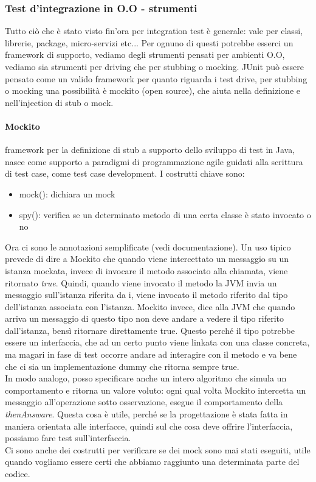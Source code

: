 \documentclass{article}
\begin{document}
\subsubsection{Test d'integrazione in O.O - strumenti}
Tutto ciò che è stato visto fin'ora per integration test è generale: vale per classi, librerie, package, micro-servizi etc... Per ognuno di questi potrebbe esserci un framework di supporto, vediamo degli strumenti pensati per ambienti O.O, vediamo sia strumenti per driving che per stubbing o mocking. JUnit può essere pensato come un valido framework per quanto riguarda i test drive, per stubbing o mocking una possibilità è mockito (open source), che aiuta nella definizione e nell'injection di stub o mock.
\paragraph{Mockito}framework per la definizione di stub a supporto dello sviluppo di test in Java, nasce come supporto a paradigmi di programmazione agile guidati alla scrittura di test case, come test case development. I costrutti chiave sono:
\begin{itemize}
\item mock(): dichiara un mock
\item spy(): verifica se un determinato metodo di una certa classe è stato invocato o no
\end{itemize}
Ora ci sono le annotazioni semplificate (vedi documentazione). Un uso tipico prevede di dire a Mockito che quando viene intercettato un messaggio su un istanza mockata, invece di invocare il metodo associato alla chiamata, viene ritornato \textit{true}. Quindi, quando viene invocato il metodo la JVM invia un messaggio sull'istanza riferita da i, viene invocato il metodo riferito dal tipo dell'istanza associata con l'istanza. Mockito invece, dice alla JVM che quando arriva un messaggio di questo tipo non deve andare a vedere il tipo riferito dall'istanza, bensì ritornare direttamente true. Questo perché il tipo potrebbe essere un interfaccia, che ad un certo punto viene linkata con una classe concreta, ma magari in fase di test occorre andare ad interagire con il metodo e va bene che ci sia un implementazione dummy che ritorna sempre true.\\ In modo analogo, posso specificare anche un intero algoritmo che simula un comportamento e ritorna un valore voluto: ogni qual volta Mockito intercetta un messaggio all'operazione sotto osservazione, esegue il comportamento della \textit{thenAnsware}. Questa cosa è utile, perché se la progettazione è stata fatta in maniera orientata alle interfacce, quindi sul che cosa deve offrire l'interfaccia, possiamo fare test sull'interfaccia.\\ Ci sono anche dei costrutti per verificare se dei mock sono mai stati eseguiti, utile quando vogliamo essere certi che abbiamo raggiunto una determinata parte del codice.
\end{document}

